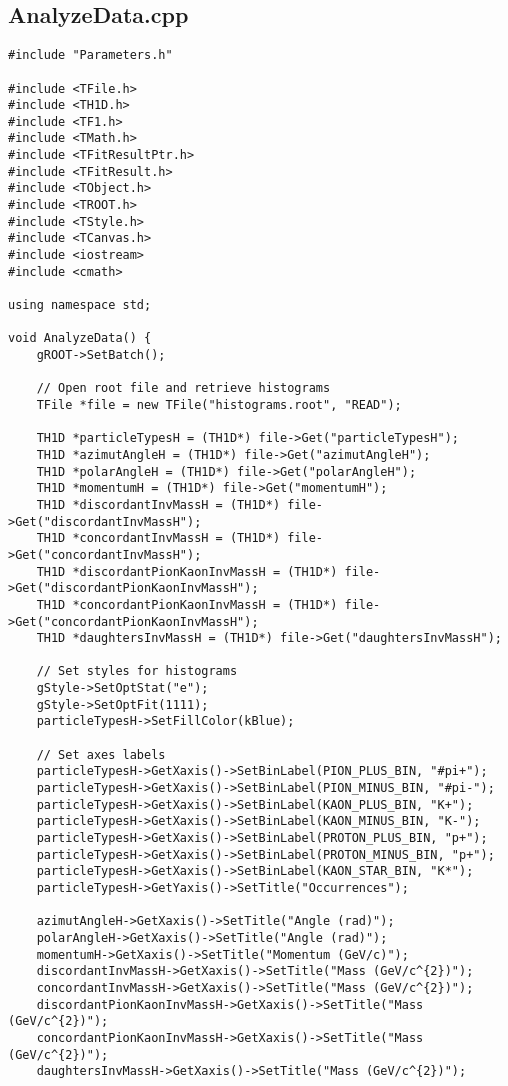 \documentclass{article}
\begin{document}
\subsection*{AnalyzeData.cpp}
\begin{verbatim}
#include "Parameters.h"

#include <TFile.h>
#include <TH1D.h>
#include <TF1.h>
#include <TMath.h>
#include <TFitResultPtr.h>
#include <TFitResult.h>
#include <TObject.h>
#include <TROOT.h>
#include <TStyle.h>
#include <TCanvas.h>
#include <iostream>
#include <cmath>

using namespace std;

void AnalyzeData() {
    gROOT->SetBatch();

    // Open root file and retrieve histograms
    TFile *file = new TFile("histograms.root", "READ");

    TH1D *particleTypesH = (TH1D*) file->Get("particleTypesH");
    TH1D *azimutAngleH = (TH1D*) file->Get("azimutAngleH");
    TH1D *polarAngleH = (TH1D*) file->Get("polarAngleH");
    TH1D *momentumH = (TH1D*) file->Get("momentumH");
    TH1D *discordantInvMassH = (TH1D*) file->Get("discordantInvMassH");
    TH1D *concordantInvMassH = (TH1D*) file->Get("concordantInvMassH");
    TH1D *discordantPionKaonInvMassH = (TH1D*) file->Get("discordantPionKaonInvMassH");
    TH1D *concordantPionKaonInvMassH = (TH1D*) file->Get("concordantPionKaonInvMassH");
    TH1D *daughtersInvMassH = (TH1D*) file->Get("daughtersInvMassH");

    // Set styles for histograms
    gStyle->SetOptStat("e");
    gStyle->SetOptFit(1111);
    particleTypesH->SetFillColor(kBlue);

    // Set axes labels
    particleTypesH->GetXaxis()->SetBinLabel(PION_PLUS_BIN, "#pi+");
    particleTypesH->GetXaxis()->SetBinLabel(PION_MINUS_BIN, "#pi-");
    particleTypesH->GetXaxis()->SetBinLabel(KAON_PLUS_BIN, "K+");
    particleTypesH->GetXaxis()->SetBinLabel(KAON_MINUS_BIN, "K-");
    particleTypesH->GetXaxis()->SetBinLabel(PROTON_PLUS_BIN, "p+");
    particleTypesH->GetXaxis()->SetBinLabel(PROTON_MINUS_BIN, "p+");
    particleTypesH->GetXaxis()->SetBinLabel(KAON_STAR_BIN, "K*");
    particleTypesH->GetYaxis()->SetTitle("Occurrences");

    azimutAngleH->GetXaxis()->SetTitle("Angle (rad)");
    polarAngleH->GetXaxis()->SetTitle("Angle (rad)");
    momentumH->GetXaxis()->SetTitle("Momentum (GeV/c)");
    discordantInvMassH->GetXaxis()->SetTitle("Mass (GeV/c^{2})");
    concordantInvMassH->GetXaxis()->SetTitle("Mass (GeV/c^{2})");
    discordantPionKaonInvMassH->GetXaxis()->SetTitle("Mass (GeV/c^{2})");
    concordantPionKaonInvMassH->GetXaxis()->SetTitle("Mass (GeV/c^{2})");
    daughtersInvMassH->GetXaxis()->SetTitle("Mass (GeV/c^{2})");


\end{verbatim}
\end{document}
